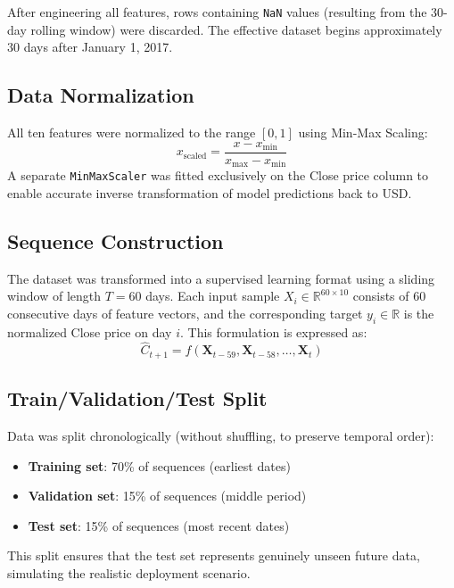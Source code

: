 \documentclass[12pt]{article}
\begin{document}
After engineering all features, rows containing \texttt{NaN} values (resulting from the 30-day rolling window) were discarded. The effective dataset begins approximately 30 days after January 1, 2017.

\subsection{Data Normalization}

All ten features were normalized to the range $[0, 1]$ using Min-Max Scaling:
\begin{equation}
    x_{\text{scaled}} = \frac{x - x_{\min}}{x_{\max} - x_{\min}}
\end{equation}
A separate \texttt{MinMaxScaler} was fitted exclusively on the Close price column to enable accurate inverse transformation of model predictions back to USD.

\subsection{Sequence Construction}

The dataset was transformed into a supervised learning format using a sliding window of length $T = 60$ days. Each input sample $X_i \in \mathbb{R}^{60 \times 10}$ consists of 60 consecutive days of feature vectors, and the corresponding target $y_i \in \mathbb{R}$ is the normalized Close price on day $i$. This formulation is expressed as:
\begin{equation}
    \hat{C}_{t+1} = f\left( \mathbf{X}_{t-59}, \mathbf{X}_{t-58}, \ldots, \mathbf{X}_{t} \right)
\end{equation}

\subsection{Train/Validation/Test Split}

Data was split chronologically (without shuffling, to preserve temporal order):
\begin{itemize}[leftmargin=*]
    \item \textbf{Training set}: 70\% of sequences (earliest dates)
    \item \textbf{Validation set}: 15\% of sequences (middle period)
    \item \textbf{Test set}: 15\% of sequences (most recent dates)
\end{itemize}
This split ensures that the test set represents genuinely unseen future data, simulating the realistic deployment scenario.
\end{document}
